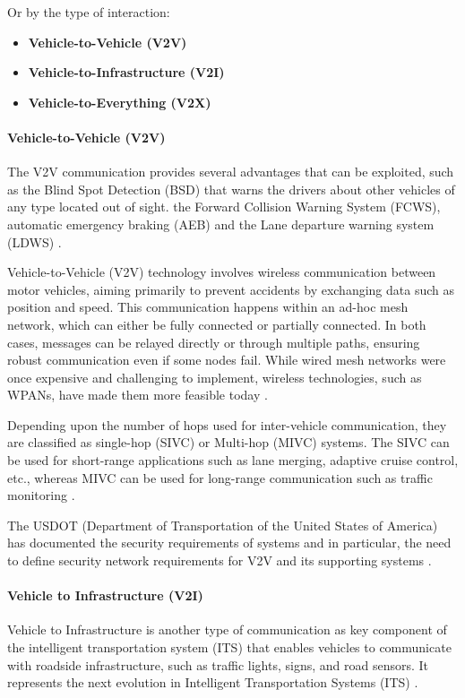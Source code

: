 Or by the type of interaction:
\begin{itemize}
    \item \textbf{Vehicle-to-Vehicle (V2V)}
    \item \textbf{Vehicle-to-Infrastructure (V2I)}
    \item \textbf{Vehicle-to-Everything (V2X)}
\end{itemize}

\paragraph{Vehicle-to-Vehicle (V2V)}

The V2V communication provides several advantages that can be exploited, such as the Blind Spot Detection (BSD) that warns the drivers about other vehicles of any type located out of sight.
the Forward Collision Warning System (FCWS), automatic emergency braking (AEB) and the Lane departure warning system (LDWS) \cite{arena2019overview} .

Vehicle-to-Vehicle (V2V) technology involves wireless communication between motor vehicles, aiming primarily to prevent accidents by exchanging data such as position and speed.
This communication happens within an ad-hoc mesh network, which can either be fully connected or partially connected.
In both cases, messages can be relayed directly or through multiple paths, ensuring robust communication even if some nodes fail.
While wired mesh networks were once expensive and challenging to implement, wireless technologies, such as WPANs, have made them more feasible today \cite{arena2019overview} .

Depending upon the number of hops used for inter-vehicle communication, they are classified as single-hop (SIVC) or
Multi-hop (MIVC) systems.
The SIVC can be used for short-range applications such as
lane merging, adaptive cruise control, etc., whereas MIVC can be used for long-range communication such as traffic monitoring \cite{zheng2020cooperative} .

The USDOT (Department of Transportation of the United States of America) has documented the security requirements of
systems and in particular, the need to define security network requirements for V2V and its supporting systems \cite{dot2021v2v} .

\paragraph{Vehicle to Infrastructure (V2I)}
Vehicle to Infrastructure is another type of communication as key component of the intelligent transportation system (ITS)
that enables vehicles to communicate with roadside infrastructure, such as traffic lights, signs, and road sensors.
It represents the next evolution in Intelligent Transportation Systems (ITS) \cite{dot2024v2i}.

